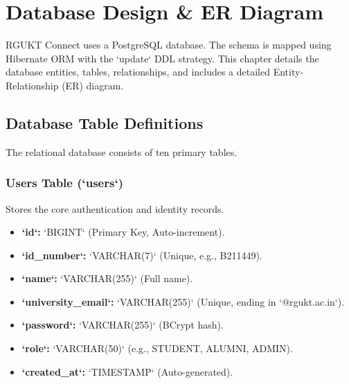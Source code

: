 \chapter{Database Design \& ER Diagram}
\label{ch:database}

RGUKT Connect uses a PostgreSQL database. The schema is mapped using Hibernate ORM with the `update` DDL strategy. This chapter details the database entities, tables, relationships, and includes a detailed Entity-Relationship (ER) diagram.

\section{Database Table Definitions}
The relational database consists of ten primary tables.

\subsection{Users Table (`users`)}
Stores the core authentication and identity records.
\begin{itemize}
    \item \textbf{`id`:} `BIGINT` (Primary Key, Auto-increment).
    \item \textbf{`id\_number`:} `VARCHAR(7)` (Unique, e.g., B211449).
    \item \textbf{`name`:} `VARCHAR(255)` (Full name).
    \item \textbf{`university\_email`:} `VARCHAR(255)` (Unique, ending in `@rgukt.ac.in`).
    \item \textbf{`password`:} `VARCHAR(255)` (BCrypt hash).
    \item \textbf{`role`:} `VARCHAR(50)` (e.g., STUDENT, ALUMNI, ADMIN).
    \item \textbf{`created\_at`:} `TIMESTAMP` (Auto-generated).
\end{itemize}


